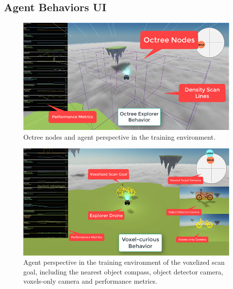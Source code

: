 \newpage

\subsection{Agent Behaviors UI}  \label{appendix:agents_explanations}



\begin{figure}[!ht]
    \includegraphics[width=1\textwidth]{images/unity-environments-training-behavior-octree2.png}
    \caption{Octree nodes and agent perspective in the training environment.}
\end{figure}

\begin{figure}[!ht]
    \includegraphics[width=1\textwidth]{images/unity-environments-training-behavior-voxel.png}
    \caption{Agent perspective in the training environment of the voxelized scan goal, including the nearest object compass, object detector camera, voxels-only camera and performance metrics.
    }
    \end{figure}

